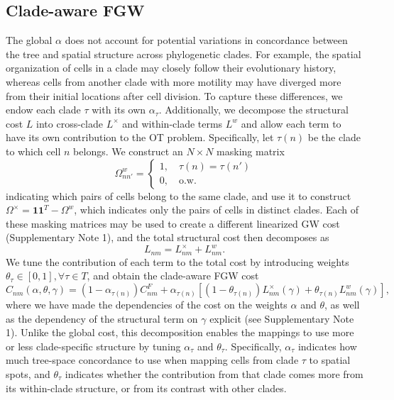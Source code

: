 \documentclass{article}
\begin{document}
\subsection*{Clade-aware FGW}

The global $\alpha$ does not account for potential variations in concordance between the tree and spatial structure across phylogenetic clades. For example, the spatial organization of cells in a clade may closely follow their evolutionary history, whereas cells from another clade with more motility may have diverged more from their initial locations after cell division. To  capture these differences, we endow each clade $\tau$ with its own $\alpha_\tau$. Additionally, we decompose the structural cost $L$ into cross-clade $L^{\times}$ and within-clade terms $L^w$ and allow each term to have its own contribution to the OT problem. Specifically, let $\tau(n)$ be the clade to which cell $n$ belongs. We construct an $N\times N$ masking matrix
\begin{equation}
    \Omega^w_{nn'} = \begin{cases}
        1, \quad \tau(n) = \tau(n')\\
        0,\quad \text{o.w.}
    \end{cases}
\end{equation}
indicating which pairs of cells belong to the same clade, and use it to construct $\Omega^{\times}=\mathbf{1}\mathbf{1}^T-\Omega^w$, which indicates only the pairs of cells in distinct clades. Each of these masking matrices may be used to create a different linearized GW cost (Supplementary Note 1), and the total structural cost then decomposes as
\begin{equation}
    L_{nm} = L^\times_{nm} + L^{w}_{nm}.
\end{equation}
We tune the contribution of each term to the total cost by introducing weights $\theta_{\tau} \in [0,1], \forall \tau \in T$, and obtain the clade-aware FGW cost
\begin{equation}
\label{eq:cladefgw_cost}
    C_{nm}(\alpha, \theta, \gamma) = (1 - \alpha_{\tau(n)}) C^F_{nm} + \alpha_{\tau(n)} \left[(1-\theta_{\tau(n)}) L^{\times}_{nm}(\gamma) + \theta_{\tau(n)} L^{w}_{nm}(\gamma)\right],
\end{equation}
where we have made the dependencies of the cost on the weights $\alpha$ and $\theta$, as well as the dependency of the structural term on $\gamma$ explicit (see Supplementary Note 1). Unlike the global cost, this decomposition enables the mappings to use more or less clade-specific structure by tuning $\alpha_\tau$ and $\theta_\tau$. Specifically, $\alpha_\tau$ indicates how much tree-space concordance to use when mapping cells from clade $\tau$ to spatial spots, and $\theta_\tau$ indicates whether the contribution from that clade comes more from its within-clade structure, or from its contrast with other clades. 
\end{document}
